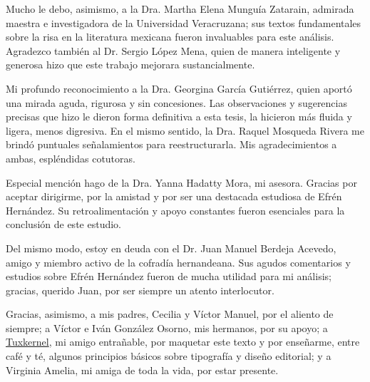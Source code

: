 \documentclass[14pt,twoside,final]{extbook} %
\begin{document}
Mucho le debo, asimismo, a la Dra. Martha Elena Munguía Zatarain, admirada maestra e investigadora de la Universidad Veracruzana; sus textos fundamentales sobre la risa en la literatura mexicana fueron invaluables para este análisis. Agradezco también al Dr. Sergio López Mena, quien de manera inteligente y generosa hizo que este trabajo mejorara sustancialmente.

Mi profundo reconocimiento a la Dra. Georgina García Gutiérrez, quien aportó una mirada aguda, rigurosa y sin concesiones. Las observaciones y sugerencias precisas que hizo le dieron forma definitiva a esta tesis, la hicieron más fluida y ligera, menos digresiva. En el mismo sentido, la Dra. Raquel Mosqueda Rivera me brindó puntuales señalamientos para reestructurarla. Mis agradecimientos a ambas, espléndidas cotutoras.

Especial mención hago de la Dra. Yanna Hadatty Mora, mi asesora. Gracias por aceptar dirigirme, por la amistad y por ser una destacada estudiosa de Efrén Hernández. Su retroalimentación y apoyo constantes fueron esenciales para la conclusión de este estudio.

Del mismo modo, estoy en deuda con el Dr. Juan Manuel Berdeja Acevedo, amigo y miembro activo de la cofradía hernandeana. Sus agudos comentarios y estudios sobre Efrén Hernández fueron de mucha utilidad para mi análisis; gracias, querido Juan, por ser siempre un atento interlocutor.

Gracias, asimismo, a mis padres, Cecilia y Víctor Manuel, por el aliento de siempre; a Víctor e Iván González Osorno, mis hermanos, por su apoyo; a \href{muxkernel@gmail.com}{Tuxkernel}, mi amigo entrañable, por maquetar este texto y por enseñarme, entre café y té, algunos principios básicos sobre tipografía y diseño editorial; y a Virginia Amelia, mi amiga de toda la vida, por estar presente.
\end{document}
